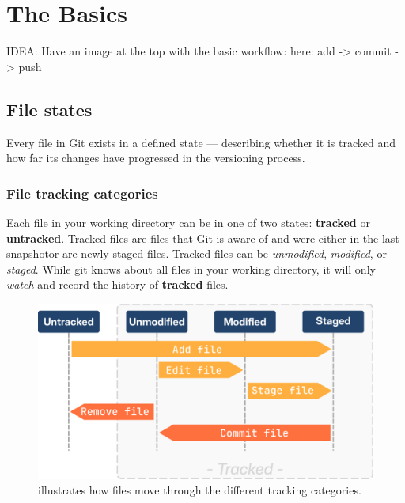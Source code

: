 \chapter{The Basics}
\chapteroverlay

IDEA: Have an image at the top with the basic workflow:
here: add -> commit -> push
\section{File states}
Every file in Git exists in a defined state — describing whether it is tracked and how far its changes have progressed in the versioning process.

\subsection{File tracking categories}
Each file in your working directory can be in one of two states: \textbf{tracked} or \textbf{untracked}. Tracked files are files that Git is aware of and were either in the last snapshot\footnotemark[1] or are newly staged files.
Tracked files can be \textit{unmodified}, \textit{modified}, or \textit{staged}. \newline
While git knows about all files in your working directory, it will only \textit{watch} and record the history of \textbf{tracked} files.

\begin{figure}[H]
\centering
    \includegraphics[scale=1]{Images/workingTree_tracked.png}
    \caption{illustrates how files move through the different tracking categories.}
\end{figure}

